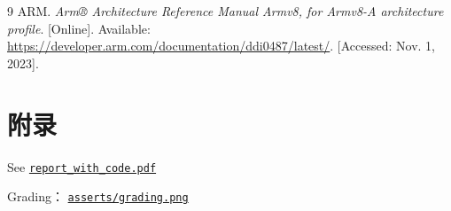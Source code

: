 \documentclass{article}
\begin{document}
	\begin{thebibliography}{9}
		ARM. \textit{Arm® Architecture Reference Manual Armv8, for Armv8-A architecture profile}. [Online]. Available: \url{https://developer.arm.com/documentation/ddi0487/latest/}. [Accessed: Nov. 1, 2023].
	\end{thebibliography}
	
	
	\section*{附录}
	See \href{./report_with_code.pdf}{\texttt{report\_with\_code.pdf}}
	
	Grading： \href{./asserts/grading.png}{\texttt{asserts/grading.png}}
%		
%		
%		
%		
%		
%		
%		
\end{document}
